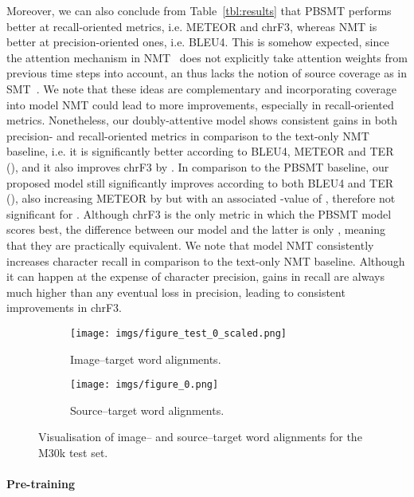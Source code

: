 \documentclass[11pt]{article}
\begin{document}
Moreover, we can also conclude from Table~\ref{tbl:results} that PBSMT performs better at recall-oriented metrics, i.e. METEOR and chrF3, whereas NMT is better at precision-oriented ones, i.e. BLEU4.
This is somehow expected, since the attention mechanism in NMT~\cite{BahdanauChoBengio2015} does not explicitly take attention weights from previous time steps into account, an thus lacks the notion of source coverage as in SMT~\cite{Koehnetal2003,Tuetal2016}.
We note that these ideas are complementary and incorporating coverage into model NMT could lead to more improvements, especially in recall-oriented metrics.
Nonetheless, our doubly-attentive model shows consistent gains in both precision- and recall-oriented metrics in comparison to the text-only NMT baseline, i.e. it is significantly better according to BLEU4, METEOR and TER (), and it also improves chrF3 by .
In comparison to the PBSMT baseline, our proposed model still significantly improves according to both BLEU4 and TER (), also increasing METEOR by  but with an associated -value of , therefore not significant for .
Although chrF3 is the only metric in which the PBSMT model scores best, the difference between our model and the latter is only , meaning that they are practically equivalent.
We note that model NMT consistently increases character recall in comparison to the text-only NMT baseline.
Although it can happen at the expense of character precision, gains in recall are always much higher than any eventual loss in precision, leading to consistent improvements in chrF3.

\begin{figure*}[ht!]
 \centering
 \begin{subfigure}{0.45\linewidth}
   \hfill
   \texttt{[image: imgs/figure\_test\_0\_scaled.png]}
   \caption{Image--target word alignments.}
 \end{subfigure}
 \begin{subfigure}{0.54\linewidth}
   \centering
   \texttt{[image: imgs/figure\_0.png]}
   \caption{Source--target word alignments.}
 \end{subfigure}
 \caption{Visualisation of image-- and source--target word alignments for the M30k test set.}
 \label{fig:attention}
\end{figure*}


\paragraph{Pre-training}
\end{document}
